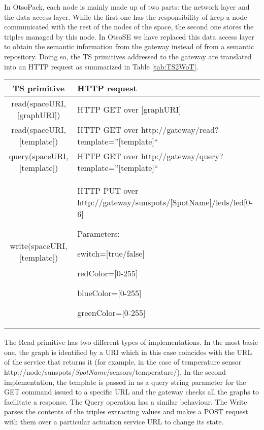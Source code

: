 In OtsoPack, each node is mainly made up of two parts: the network layer and the data access layer. While the first one has the responsibility of
keep a node communicated with the rest of the nodes of the space, the second one stores the triples managed by this node.
In OtsoSE we have replaced this data access layer to obtain the semantic information from the gateway instead of from a semantic repository.
Doing so, the TS primitives addressed to the gateway are translated into an HTTP request as summarized in Table \ref{tab:TS2WoT}.
\begin{table*}[t!] %
\centering
\caption {Mappings between OtsoPack's primitives and HTTP requests addressed to a WoT solution.}
\begin{tabular}{|c|p{10cm}|}
\hline
TS primitive & HTTP request \\
\hline \hline
read(spaceURI,[graphURI]) & HTTP GET over [graphURI] \\
\hline
read(spaceURI,[template]) & HTTP GET over http://gateway/read?template={''[template]``} \\
\hline
query(spaceURI,[template]) & HTTP GET over http://gateway/query?template={''[template]``}\\
\hline
write(spaceURI,[template]) & HTTP PUT over http://gateway/sunspots/[SpotName]/leds/led[0-6]

Parameters:
\begin{itemize_cells}
  \item switch=[true/false]
  \item redColor=[0-255]
  \item blueColor=[0-255]
  \item greenColor=[0-255]
\end{itemize_cells}

\\
\hline
\end{tabular}
\label{tab:TS2WoT}
\end{table*}

The Read primitive has two different types of implementations. In the most basic one, the graph is identified by a URI which in this case
coincides with the URL of the service that returns it (for example, in the case of temperature sensor
http://node/sunspots/\textit{SpotName}/sensors/temperature/). In the second implementation, the template is passed in as a query string parameter for
the GET command issued to a specific URL and the gateway checks all the graphs to facilitate a response. The Query operation has a similar behaviour.
The Write parses the contents of the triples extracting values and makes a POST request with them over a particular actuation service URL to change
its state.


